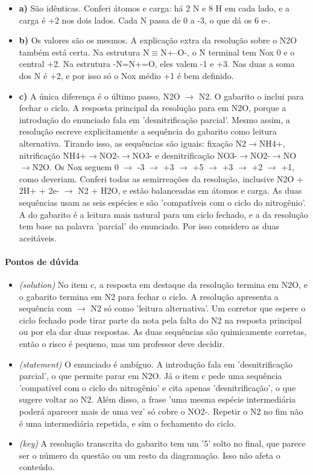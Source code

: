 \documentclass{article}%
\begin{document}
\begin{itemize}%
\item%
\textbf{a)} São idênticas. Conferi átomos e carga: há 2 N e 8 H em cada lado, e a carga é +2 nos dois lados. Cada N passa de 0 a -3, o que dá os 6 e-.%
\item%
\textbf{b)} Os valores são os mesmos. A explicação extra da resolução sobre o N2O também está certa. Na estrutura N$\equiv$N+--O-, o N terminal tem Nox 0 e o central +2. Na estrutura -N=N+=O, eles valem -1 e +3. Nas duas a soma dos N é +2, e por isso só o Nox médio +1 é bem definido.%
\item%
\textbf{c)} A única diferença é o último passo, N2O $\to$ N2. O gabarito o inclui para fechar o ciclo. A resposta principal da resolução para em N2O, porque a introdução do enunciado fala em 'desnitrificação parcial'. Mesmo assim, a resolução escreve explicitamente a sequência do gabarito como leitura alternativa. Tirando isso, as sequências são iguais: fixação N2$\to$NH4+, nitrificação NH4+$\to$NO2-$\to$NO3- e desnitrificação NO3-$\to$NO2-$\to$NO$\to$N2O. Os Nox seguem 0 $\to$ -3 $\to$ +3 $\to$ +5 $\to$ +3 $\to$ +2 $\to$ +1, como deveriam. Conferi todas as semirreações da resolução, inclusive N2O + 2H+ + 2e- $\to$ N2 + H2O, e estão balanceadas em átomos e carga. As duas sequências usam as seis espécies e são 'compatíveis com o ciclo do nitrogênio'. A do gabarito é a leitura mais natural para um ciclo fechado, e a da resolução tem base na palavra 'parcial' do enunciado. Por isso considero as duas aceitáveis.%
\end{itemize}%
\paragraph{Pontos de dúvida}%
\begin{itemize}%
\item%
\textit{(solution)} No item c, a resposta em destaque da resolução termina em N2O, e o gabarito termina em N2 para fechar o ciclo. A resolução apresenta a sequência com $\to$ N2 só como 'leitura alternativa'. Um corretor que espere o ciclo fechado pode tirar parte da nota pela falta do N2 na resposta principal ou por ela dar duas respostas. As duas sequências são quimicamente corretas, então o risco é pequeno, mas um professor deve decidir.%
\item%
\textit{(statement)} O enunciado é ambíguo. A introdução fala em 'desnitrificação parcial', o que permite parar em N2O. Já o item c pede uma sequência 'compatível com o ciclo do nitrogênio' e cita apenas 'desnitrificação', o que sugere voltar ao N2. Além disso, a frase 'uma mesma espécie intermediária poderá aparecer mais de uma vez' só cobre o NO2-. Repetir o N2 no fim não é uma intermediária repetida, e sim o fechamento do ciclo.%
\item%
\textit{(key)} A resolução transcrita do gabarito tem um '5' solto no final, que parece ser o número da questão ou um resto da diagramação. Isso não afeta o conteúdo.%
\end{itemize}%
\end{document}
